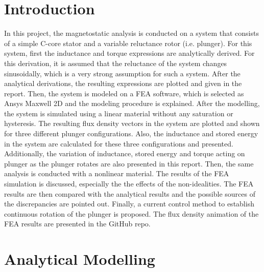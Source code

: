 \documentclass[11pt]{report}
\begin{document}
\maketitle

\tableofcontents
\section*{Introduction}

In this project, the magnetostatic analysis is conducted on a system that consists of a simple C-core stator and a variable reluctance rotor (i.e. plunger). For this system, first the inductance and torque expressions are analytically derived. For this derivation, it is assumed that the reluctance of the system changes sinusoidally, which is a very strong assumption for such a system. After the analytical derivations, the resulting expressions are plotted and given in the report. Then, the system is modeled on a FEA software, which is selected as Ansys Maxwell 2D and the modeling procedure is explained. After the modelling, the system is simulated using a linear material without any saturation or hysteresis. The resulting flux density vectors in the system are plotted and shown for three different plunger configurations. Also, the inductance and stored energy in the system are calculated for these three configurations and presented. Additionally, the variation of inductance, stored energy and torque acting on plunger as the plunger rotates are also presented in this report. Then, the same analysis is conducted with a nonlinear material. The results of the FEA simulation is discussed, especially the the effects of the non-idealities. The FEA results are then compared with the analytical results and the possible sources of the discrepancies are pointed out. Finally, a current control method to establish continuous rotation of the plunger is proposed. The flux density animation of the FEA results are presented in the GitHub repo. 

\newpage

\section*{Analytical Modelling}
\end{document}
